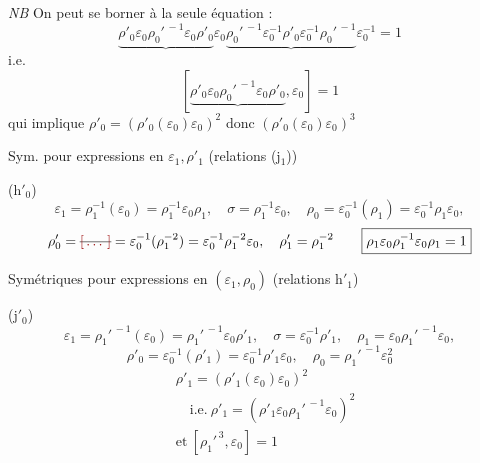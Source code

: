 \documentclass[11pt,a4paper]{article}
\begin{document}
\emph{NB} On peut se borner à la seule équation  :
\[
\underbrace{\rho'_0\varepsilon_0\rho_0'^{\,-1}\varepsilon_0\rho'_0}\varepsilon_0\underbrace{\rho_0'^{\,-1}\varepsilon_0^{-1}\rho'_0\varepsilon_0^{-1}\rho_0'^{\,-1}}\varepsilon_0^{-1} = 1
\]
i.e.
\[
[\underbrace{\rho'_0\varepsilon_0\rho_0'^{\,-1}\varepsilon_0\rho'_0}, \varepsilon_0] = 1
\]
qui implique \struck{\ill{}} $\rho'_0 = (\rho'_0(\varepsilon_0)\varepsilon_0)^2$ donc $(\rho'_0(\varepsilon_0)\varepsilon_0)^3$

Sym. pour expressions en $\varepsilon_1, \rho'_1$ (relations (j$_1$))

(h$'_0$) 
\[
\varepsilon_1 = \rho_1^{-1}(\varepsilon_0) = \rho_1^{-1}\varepsilon_0\rho_1, \quad
\sigma = \rho_1^{-1}\varepsilon_0, \quad
\rho_0 = \varepsilon_0^{-1}(\rho_1) = \varepsilon_0^{-1}\rho_1\varepsilon_0,
\]
\[
\rho'_0 = \text{\struck{\ill{}}} = \varepsilon_0^{-1}(\rho_1^{-2}) = \varepsilon_0^{-1}\rho_1^{-2}\varepsilon_0, \quad
\rho'_1 = \rho_1^{-2}
\qquad
\boxed{\rho_1\varepsilon_0\rho_1^{-1}\varepsilon_0\rho_1 = 1}
\]

Symétriques pour expressions en $(\varepsilon_1, \rho_0)$ (relations h$'_1$)

(j$'_0$) 
\[
\varepsilon_1 = \rho_1'^{\,-1}(\varepsilon_0) = \rho_1'^{\,-1}\varepsilon_0\rho'_1, \quad
\sigma = \varepsilon_0^{-1}\rho'_1, \quad
\rho_1 = \varepsilon_0\rho_1'^{\,-1}\varepsilon_0,
\]
\[
\rho'_0 = \varepsilon_0^{-1}(\rho'_1) = \varepsilon_0^{-1}\rho'_1\varepsilon_0, \quad
\rho_0 = \rho_1'^{\,-1}\varepsilon_0^2
\]
\[
\boxed{\begin{aligned}
&\rho'_1 = (\rho'_1(\varepsilon_0)\varepsilon_0)^2 \\
&\quad \text{i.e.} \ \rho'_1 = (\rho'_1\varepsilon_0\rho_1'^{\,-1}\varepsilon_0)^2 \\
&\text{et} \ [\rho_1'^{\,3}, \varepsilon_0] = 1
\end{aligned}}
\]
\end{document}
